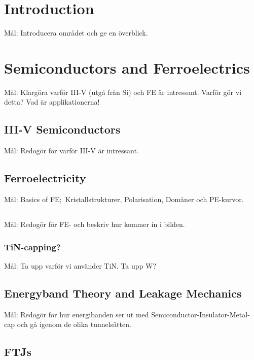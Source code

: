 \documentclass[11pt]{article}
\begin{document}
    \section{Introduction}

    Mål: Introducera området och ge en överblick.\cite{atle2019development}

    \section{Semiconductors and Ferroelectrics}

    Mål: Klargöra varför III-V (utgå från Si) och FE är intressant. Varför gör vi detta? Vad är applikationerna!

        \subsection{III-V Semiconductors}

        Mål: Redogör för varför III-V är intressant.

        \subsection{Ferroelectricity}

        Mål: Basics of FE;\ Kristallstrukturer, Polarisation, Domäner och PE-kurvor.

        \subsection{}

        Mål: Redogör för FE- och beskriv hur  kommer in i bilden.

            \subsubsection{TiN-capping?}

            Mål: Ta upp varför vi använder TiN. Ta upp W?\ 

        \subsection{Energyband Theory and Leakage Mechanics}

        Mål: Redogör för hur energibanden ser ut med Semiconductor-Insulator-Metal-cap och gå igenom de olika tunnelsätten.

        \subsection{FTJs}
\end{document}
